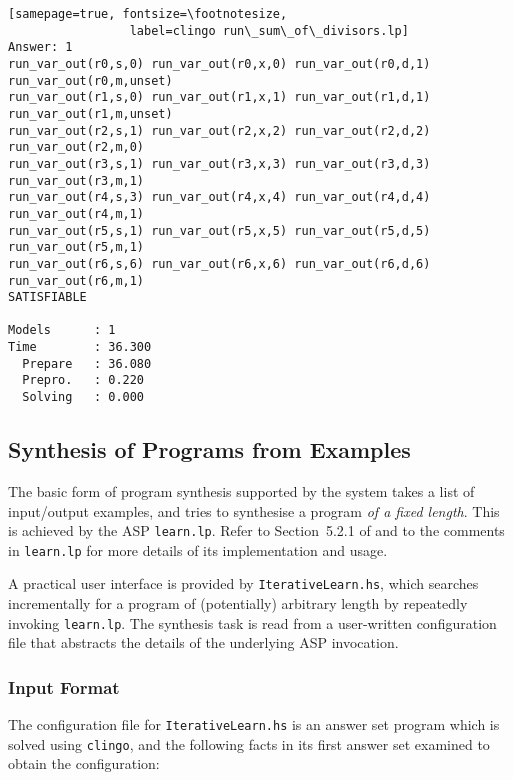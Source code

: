 \documentclass[a4paper,twoside,notitlepage,12pt]{article}
\begin{document}
\begin{verbatim}[samepage=true, fontsize=\footnotesize,
                 label=clingo run\_sum\_of\_divisors.lp]
Answer: 1
run_var_out(r0,s,0) run_var_out(r0,x,0) run_var_out(r0,d,1) run_var_out(r0,m,unset)
run_var_out(r1,s,0) run_var_out(r1,x,1) run_var_out(r1,d,1) run_var_out(r1,m,unset)
run_var_out(r2,s,1) run_var_out(r2,x,2) run_var_out(r2,d,2) run_var_out(r2,m,0)
run_var_out(r3,s,1) run_var_out(r3,x,3) run_var_out(r3,d,3) run_var_out(r3,m,1)
run_var_out(r4,s,3) run_var_out(r4,x,4) run_var_out(r4,d,4) run_var_out(r4,m,1)
run_var_out(r5,s,1) run_var_out(r5,x,5) run_var_out(r5,d,5) run_var_out(r5,m,1)
run_var_out(r6,s,6) run_var_out(r6,x,6) run_var_out(r6,d,6) run_var_out(r6,m,1)
SATISFIABLE

Models      : 1     
Time        : 36.300
  Prepare   : 36.080
  Prepro.   : 0.220
  Solving   : 0.000
\end{verbatim}

\subsection{Synthesis of Programs from Examples} \label{sec:psynx}

The basic form of program synthesis supported by the system takes a list of 
input/output examples, and tries to synthesise a program \emph{of a fixed length}.
This is achieved by the ASP \verb|learn.lp|. Refer to Section~5.2.1 of 
\cite{final} and to the comments in \verb|learn.lp| for more details of its 
implementation and usage.

A practical user interface is provided by \verb|IterativeLearn.hs|, which 
searches incrementally for a program of (potentially) arbitrary length by 
repeatedly invoking \verb|learn.lp|. The synthesis task is read from a 
user-written configuration file that abstracts the details of the underlying 
ASP invocation.

\subsubsection{Input Format}

The configuration file for \verb|IterativeLearn.hs| is an answer set program 
which is solved using \verb|clingo|, and the following facts in its first 
answer set examined to obtain the configuration:
\end{document}
